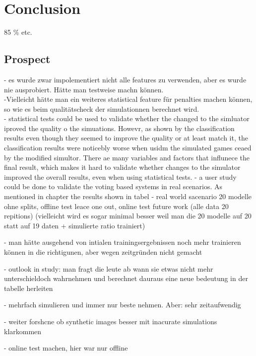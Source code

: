 \chapter{Conclusion}
85 \% etc.  

\section{Prospect}
- es wurde zwar impolementiert nicht alle features zu verwenden, aber es wurde nie ausprobiert. Hätte man testweise machn können. \\
-Vielleicht hätte man ein weiteres statistical feature für penalties machen können, so wie es beim qualitätscheck der simulationnen berechnet wird.\\
- statistical tests could be used to validate whether the changed to the simluator iproved the quality o the simuations. Howevr, as shown by the classification results even though they seemed to improve the quality or at least match it, the classification results were noticebly worse when usidm the simulated games ceaed by the modified simultor. There ae many variables and factors that influnece the final result, which makes it hard to validate whether changes to the simulator improved the overall results, even when using statistical tests. 
- a user study could be done to validate the voting based systems in real scenarios. As mentioned in chapter  the results shown in tabel  
- real world sacenario 20 modelle ohne splits, offline test leace one out, online test future work (alle data 20 repitions) (vielleicht wird es sogar minimal besser weil man die 20 modelle auf 20 statt auf 19 daten + simulierte ratio trainiert)

- man hätte ausgehend von intialen trainingsergebnissen noch mehr trainieren können in die richtigunen, aber wegen zeitgründen nicht gemacht 


- outlook in study: man fragt die leute ab wann sie etwas nicht 
mehr unterschieldoch wahrnehmen und berechnet dauraus eine neue bedeutung in der tabelle herleiten 

- mehrfach simulieren und immer nur beste nehmen. Aber: sehr zeitaufwendig

- weiter forshcne ob synthetic images besser mit inacurate simulations klarkommen

- online test machen, hier war nur offline
